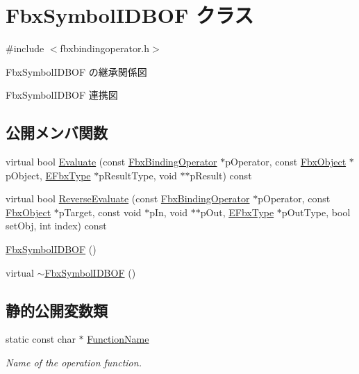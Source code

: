 \hypertarget{class_fbx_symbol_i_d_b_o_f}{}\section{Fbx\+Symbol\+I\+D\+B\+OF クラス}
\label{class_fbx_symbol_i_d_b_o_f}


{\ttfamily \#include $<$fbxbindingoperator.\+h$>$}



Fbx\+Symbol\+I\+D\+B\+OF の継承関係図


Fbx\+Symbol\+I\+D\+B\+OF 連携図
\subsection*{公開メンバ関数}
\begin{DoxyCompactItemize}
\item 
virtual bool \hyperlink{class_fbx_symbol_i_d_b_o_f_a2cb2538884cf58d68a0ee37fbf910cea}{Evaluate} (const \hyperlink{class_fbx_binding_operator}{Fbx\+Binding\+Operator} $\ast$p\+Operator, const \hyperlink{class_fbx_object}{Fbx\+Object} $\ast$p\+Object, \hyperlink{fbxpropertytypes_8h_a73913a5ddfb20e57c6f25e9e6784bd92}{E\+Fbx\+Type} $\ast$p\+Result\+Type, void $\ast$$\ast$p\+Result) const
\item 
virtual bool \hyperlink{class_fbx_symbol_i_d_b_o_f_a2d4eee3d2a4fbf9790b2491ed33846b3}{Reverse\+Evaluate} (const \hyperlink{class_fbx_binding_operator}{Fbx\+Binding\+Operator} $\ast$p\+Operator, const \hyperlink{class_fbx_object}{Fbx\+Object} $\ast$p\+Target, const void $\ast$p\+In, void $\ast$$\ast$p\+Out, \hyperlink{fbxpropertytypes_8h_a73913a5ddfb20e57c6f25e9e6784bd92}{E\+Fbx\+Type} $\ast$p\+Out\+Type, bool set\+Obj, int index) const
\item 
\hyperlink{class_fbx_symbol_i_d_b_o_f_a45254540be4b921c3aaad8047666df1a}{Fbx\+Symbol\+I\+D\+B\+OF} ()
\item 
virtual \hyperlink{class_fbx_symbol_i_d_b_o_f_aec3c76be513ae86eb878c1d7bd3f0847}{$\sim$\+Fbx\+Symbol\+I\+D\+B\+OF} ()
\end{DoxyCompactItemize}
\subsection*{静的公開変数類}
\begin{DoxyCompactItemize}
\item 
static const char $\ast$ \hyperlink{class_fbx_symbol_i_d_b_o_f_a7f5ac03e2e8bb5358dff19973afee349}{Function\+Name}
\begin{DoxyCompactList}\small\item\em Name of the operation function. \end{DoxyCompactList}\end{DoxyCompactItemize}


